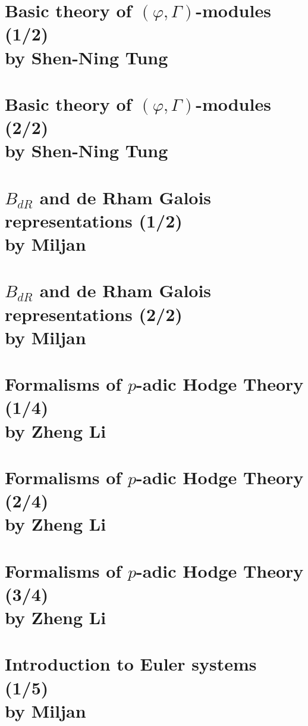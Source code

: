 \documentclass[12pt,amsfont]{amsart}
\begin{document}
\newpage
\section{Basic theory of $(\varphi, \Gamma)$-modules (1/2)\\ by Shen-Ning Tung}\label{10}

\newpage
\section{Basic theory of $(\varphi, \Gamma)$-modules (2/2)\\ by Shen-Ning Tung}\label{11}

\newpage
\section{$B_{dR}$ and de Rham Galois representations (1/2)\\ by Miljan}\label{12}

\newpage
\section{$B_{dR}$ and de Rham Galois representations (2/2)\\ by Miljan}\label{13}

\newpage
\section{Formalisms of $p$-adic Hodge Theory
 (1/4)\\ by Zheng Li}\label{14}

\newpage
\section{Formalisms of $p$-adic Hodge Theory
 (2/4)\\ by Zheng Li}\label{15}

\newpage
\section{Formalisms of $p$-adic Hodge Theory
 (3/4)\\ by Zheng Li}\label{16}

\newpage
\section{Introduction to Euler systems (1/5)
\\ by Miljan}\label{17}
\end{document}
